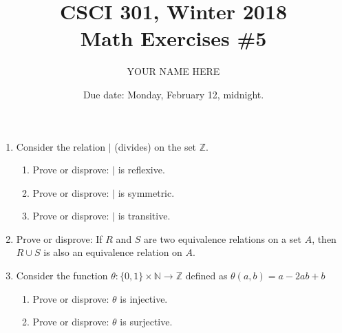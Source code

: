 \documentclass{article}
\title{CSCI 301, Winter 2018\\Math Exercises \#5}
\author{YOUR NAME HERE}
\date{Due date:  Monday, February 12, midnight.}
\begin{document}
\maketitle

\begin{enumerate}

\item Consider the relation $\mid$ (divides) on the set $\mathbb{Z}$.
  \begin{enumerate}
  \item Prove or disprove: $\mid$ is reflexive.
  \item Prove or disprove: $\mid$ is symmetric.
  \item Prove or disprove: $\mid$ is transitive.
  \end{enumerate}

\item Prove or disprove: If $R$ and $S$ are two equivalence relations on a
  set $A$, then $R\cup S$ is also an equivalence relation on $A$.

\item Consider the function
  $\theta : \{0,1\}\times\mathbb{N} \rightarrow \mathbb{Z}$
  defined as  $\theta(a,b) = a -2ab + b$

    \begin{enumerate}
    \item     Prove or disprove: $\theta$ is injective.
      \item     Prove or disprove: $\theta$ is surjective.
    \end{enumerate}

\end{enumerate}
\end{document}
